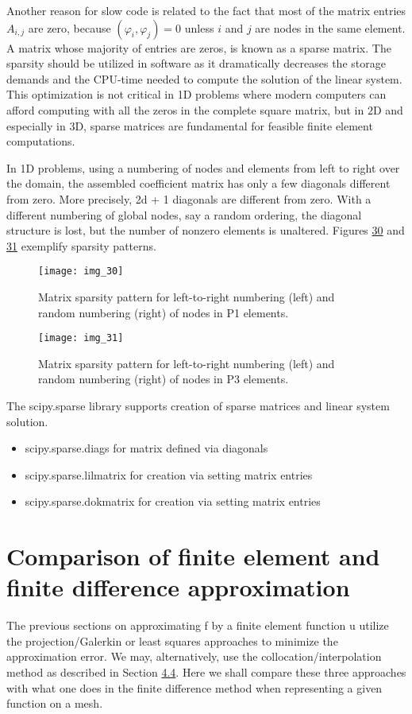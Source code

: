 \documentclass[../main.tex]{subfiles}
\begin{document}
Another reason for slow code is related to the fact that most of the matrix entries $A_{i, j}$ are zero, because $\left(\varphi_{i}, \varphi_{j}\right)=0$ unless $i$ and $j$ are nodes in the same element. A matrix whose majority of entries are zeros, is known as a sparse matrix. The sparsity should be utilized in software as it dramatically decreases the storage demands and the CPU-time needed to compute the solution of the linear system. This optimization is not critical in 1D problems where modern computers can afford computing with all the zeros in the complete square matrix, but in $2 \mathrm{D}$ and especially in 3D, sparse matrices are fundamental for feasible finite element computations.

In 1D problems, using a numbering of nodes and elements from left to right
over the domain, the assembled coefficient matrix has only a few diagonals
different from zero. More precisely, 2d + 1 diagonals are different from zero.
With a different numbering of global nodes, say a random ordering, the diagonal
structure is lost, but the number of nonzero elements is unaltered. Figures \hyperref[fig:img_30]{30}
and \hyperref[fig:img_31]{31} exemplify sparsity patterns.
\begin{figure}[H]
	\centering
	\texttt{[image: img\_30]}
	\caption{Matrix sparsity pattern for left-to-right numbering (left) and random
		numbering (right) of nodes in P1 elements.}
	\label{fig:img_30}
\end{figure}
\begin{figure}[H]
	\centering
	\texttt{[image: img\_31]}
	\caption{Matrix sparsity pattern for left-to-right numbering (left) and random
		numbering (right) of nodes in P3 elements.}
	\label{fig:img_31}
\end{figure}

The scipy.sparse library supports creation of sparse matrices and linear system solution.
\begin{itemize}
	\item scipy.sparse.diags for matrix defined via diagonals
	\item scipy.sparse.lil\textunderscore matrix for creation via setting matrix entries
	\item scipy.sparse.dok\textunderscore matrix for creation via setting matrix entries
\end{itemize}
\chapter{Comparison of finite element and finite difference approximation}
\label{chap:chap_5}
\noindent The previous sections on approximating f by a finite element function u utilize
the projection/Galerkin or least squares approaches to minimize the approximation error. We may, alternatively, use the collocation/interpolation method
as described in Section \hyperref[sec:sec_4_4]{4.4}. Here we shall compare these three approaches with
what one does in the finite difference method when representing a given function
on a mesh.
\end{document}
